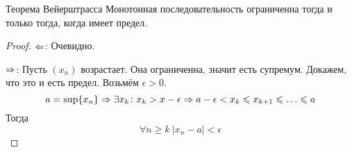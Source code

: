 \begin{theorem}{Теорема Вейерштрасса}
Монотонная последовательность ограниченна тогда и только тогда, когда имеет предел.
\end{theorem}
\begin{proof}
$\Leftarrow$: Очевидно.

$\Rightarrow$: Пусть $(x_n)$ возрастает. Она ограниченна, значит есть супремум. Докажем, что это и есть предел. Возьмём $\epsilon > 0$.
$$a = \sup \{x_n\} \Rightarrow \exists x_k\colon x_k > x - \epsilon \Rightarrow a - \epsilon < x_k \leqslant x_{k+1} \leqslant \ldots \leqslant a$$
Тогда $$\forall n \geqslant k\: |x_n - a| < \epsilon$$
\end{proof}